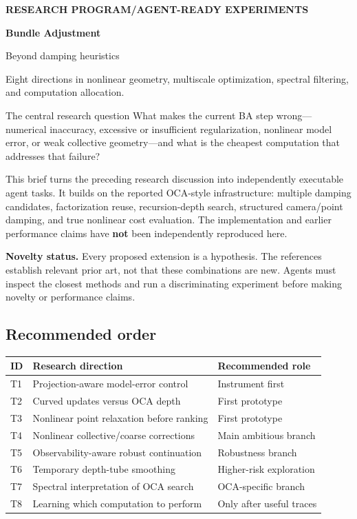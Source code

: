 \documentclass[11pt,a4paper]{article}
\newcommand{\kicker}[1]{{\sffamily\small\bfseries\color{accent}#1}\par}
\begin{document}
\thispagestyle{fancy}
\vspace*{3mm}
\kicker{RESEARCH PROGRAM\quad /\quad AGENT-READY EXPERIMENTS}
{\sffamily\fontsize{29}{33}\selectfont\bfseries\color{ink}Bundle Adjustment\par}
\vspace{3mm}
{\sffamily\fontsize{17}{21}\selectfont\color{ink}Beyond damping heuristics\par}
\vspace{3mm}
{\large Eight directions in nonlinear geometry, multiscale optimization, spectral filtering, and computation allocation.\par}
\vspace{4mm}
\begin{briefbox}{The central research question}
What makes the current BA step wrong---numerical inaccuracy, excessive or insufficient regularization, nonlinear model error, or weak collective geometry---and what is the cheapest computation that addresses that failure?
\end{briefbox}

This brief turns the preceding research discussion into independently executable agent tasks. It builds on the reported OCA-style infrastructure: multiple damping candidates, factorization reuse, recursion-depth search, structured camera/point damping, and true nonlinear cost evaluation. The implementation and earlier performance claims have \textbf{not} been independently reproduced here.

\textbf{Novelty status.} Every proposed extension is a hypothesis. The references establish relevant prior art, not that these combinations are new. Agents must inspect the closest methods and run a discriminating experiment before making novelty or performance claims.

\subsection*{Recommended order}
\renewcommand{\arraystretch}{1.15}
\begin{tabularx}{\linewidth}{@{}p{9mm}Yp{42mm}@{}}
\toprule
\textbf{ID} & \textbf{Research direction} & \textbf{Recommended role}\\
\midrule
T1 & Projection-aware model-error control & Instrument first\\
T2 & Curved updates versus OCA depth & First prototype\\
T3 & Nonlinear point relaxation before ranking & First prototype\\
T4 & Nonlinear collective/coarse corrections & Main ambitious branch\\
T5 & Observability-aware robust continuation & Robustness branch\\
T6 & Temporary depth-tube smoothing & Higher-risk exploration\\
T7 & Spectral interpretation of OCA search & OCA-specific branch\\
T8 & Learning which computation to perform & Only after useful traces\\
\bottomrule
\end{tabularx}
\end{document}
